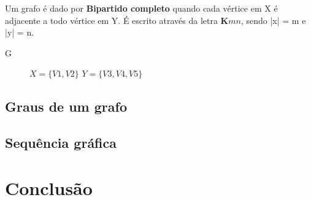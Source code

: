 \documentclass[a4paper, 12pt]{article}
\begin{document}
Um grafo é dado por \textbf{Bipartido completo} quando cada vértice em X é adjacente a todo vértice em Y. É escrito através da letra $\textbf{K}{mn}$, sendo |x| = m e |y| = n.

\begin{center}
	G\:
	\begin{figure}[hbt!]
		\centering

	\caption{$X = \{V1, V2\}$ $Y = \{V3, V4, V5\}$}
\end{figure}
\end{center}


\subsection{Graus de um grafo}
\subsection{Sequência gráfica}
\section{Conclusão}
\end{document}
